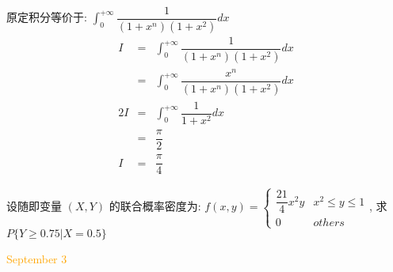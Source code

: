 \begin{solution}

	原定积分等价于:  $\int_{0}^{+\infty}\dfrac{1}{(1+x^{n})(1+x^2)}dx$
	\begin{eqnarray*}
		I&=&\int_{0}^{+\infty}\dfrac{1}{(1+x^{n})(1+x^2)}dx\\
		&=&\int_{0}^{+\infty}\dfrac{x^n}{(1+x^{n})(1+x^2)}dx\\
		2I&=&\int_{0}^{+\infty}\dfrac{1}{1+x^2}dx\\
		&=&\dfrac{\pi}{2}\\
		I&=&\dfrac{\pi}{4}
	\end{eqnarray*}
\end{solution}

\begin{example}[][Exam: 35.1.4]
	设随即变量 $(X,Y)$ 的联合概率密度为: $f(x,y)=
	\begin{cases}
		\dfrac{21}{4}x^2y  & x^2\leq y\leq 1\\
		0  & others
	\end{cases}$, 求 $P\{Y\geq 0.75|X=0.5\}$
\end{example}

\begin{solution}
	
\end{solution}


\textcolor{orange}{September 3}

